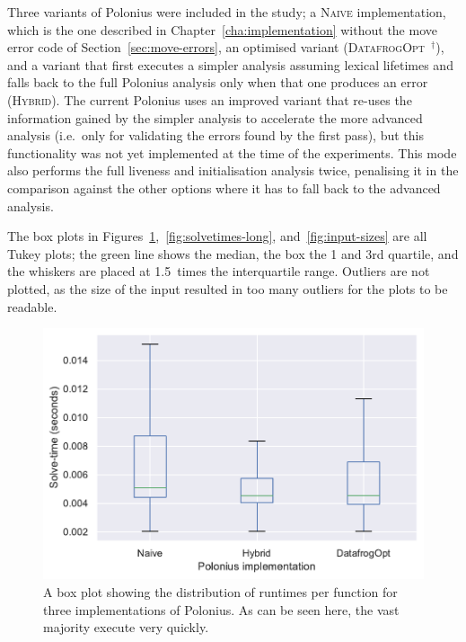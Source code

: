 \documentclass[11pt,a4paper,twoside,openany]{report}
\newcommand{\notmine}[0] {$^\dagger$}
\begin{document}
Three variants of Polonius were included in the study; a \textsc{Naive}
implementation, which is the one described in Chapter~\ref{cha:implementation}
without the move error code of Section~\ref{sec:move-errors}, an optimised
variant (\textsc{DatafrogOpt}~\notmine{}), and a variant that first executes a
simpler analysis assuming lexical lifetimes and falls back to the full Polonius
analysis only when that one produces an error (\textsc{Hybrid}). The current
Polonius uses an improved variant that re-uses the information gained by the
simpler analysis to accelerate the more advanced analysis (i.e.\ only for
validating the errors found by the first pass), but this
functionality was not yet implemented at the time of the experiments. This mode
also performs the full liveness and initialisation analysis twice, penalising it
in the comparison against the other options where it has to fall back to the
advanced analysis.

The box plots in Figures~\ref{fig:solvetimes},~\ref{fig:solvetimes-long},
and~\ref{fig:input-sizes} are all Tukey plots; the green line shows the median,
the box the 1 and 3rd quartile, and the whiskers are placed at 1.5~times the
interquartile range. Outliers are not plotted, as the size of the input resulted
in too many outliers for the plots to be readable.

\begin{figure}
  \includegraphics[width=0.9\linewidth]{Graphs/solvetimes_boxplot.pdf}
  \caption[Runtimes Per Function for Three Polonius Variants]{A box plot
    showing the distribution of runtimes per function for three
    implementations of Polonius. As can be seen here, the vast majority execute
    very quickly.}\label{fig:solvetimes}
\end{figure}
\end{document}
